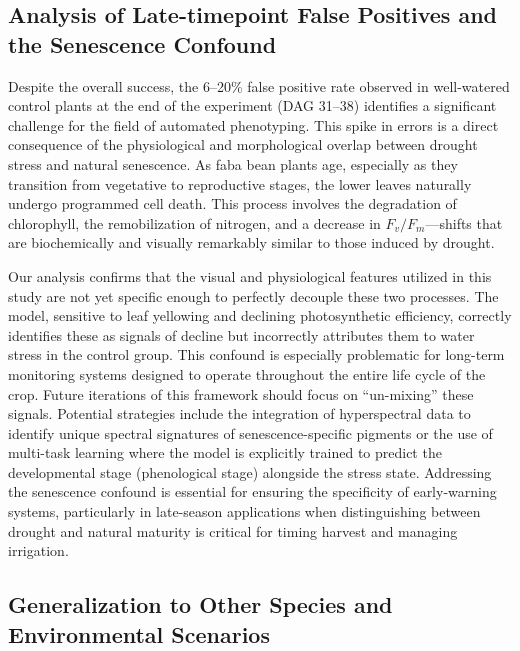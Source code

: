 \documentclass[a4paper,fleqn]{cas-dc}
\begin{document}
\subsection{Analysis of Late-timepoint False Positives and the Senescence Confound}\label{sec:discussion:fp}

Despite the overall success, the 6--20\% false positive rate observed in well-watered control plants at the end of the experiment (DAG 31--38) identifies a significant challenge for the field of automated phenotyping. This spike in errors is a direct consequence of the physiological and morphological overlap between drought stress and natural senescence. As faba bean plants age, especially as they transition from vegetative to reproductive stages, the lower leaves naturally undergo programmed cell death. This process involves the degradation of chlorophyll, the remobilization of nitrogen, and a decrease in $F_v/F_m$---shifts that are biochemically and visually remarkably similar to those induced by drought.

Our analysis confirms that the visual and physiological features utilized in this study are not yet specific enough to perfectly decouple these two processes. The model, sensitive to leaf yellowing and declining photosynthetic efficiency, correctly identifies these as signals of decline but incorrectly attributes them to water stress in the control group. This confound is especially problematic for long-term monitoring systems designed to operate throughout the entire life cycle of the crop. Future iterations of this framework should focus on ``un-mixing'' these signals. Potential strategies include the integration of hyperspectral data to identify unique spectral signatures of senescence-specific pigments or the use of multi-task learning where the model is explicitly trained to predict the developmental stage (phenological stage) alongside the stress state. Addressing the senescence confound is essential for ensuring the specificity of early-warning systems, particularly in late-season applications when distinguishing between drought and natural maturity is critical for timing harvest and managing irrigation.

\subsection{Generalization to Other Species and Environmental Scenarios}\label{sec:discussion:generalization}
\end{document}

